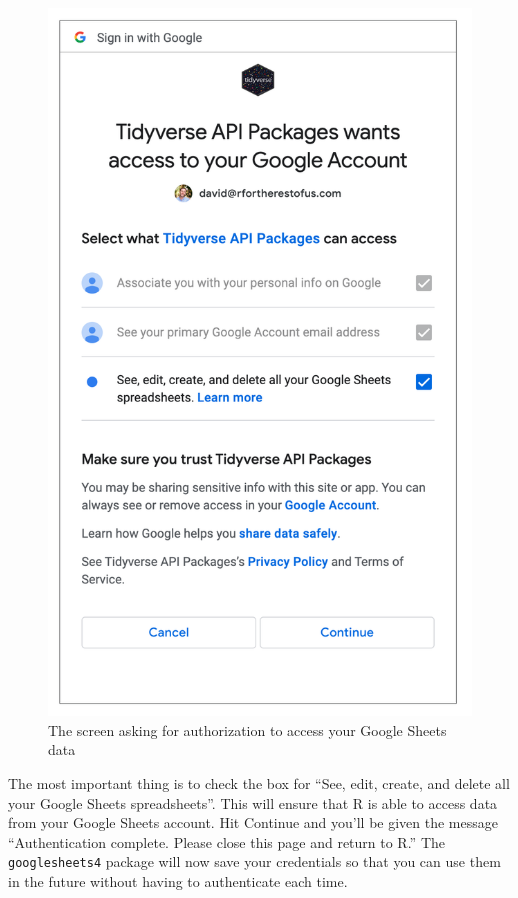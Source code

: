 \documentclass[
]{book}
\begin{document}
\begin{figure}
\includegraphics[width=1\linewidth]{assets/tidyverse-access-r} \caption{The screen asking for authorization to access your Google Sheets data}\label{fig:tidyverse-access-r}
\end{figure}

The most important thing is to check the box for ``See, edit, create, and delete all your Google Sheets spreadsheets''. This will ensure that R is able to access data from your Google Sheets account. Hit Continue and you'll be given the message ``Authentication complete. Please close this page and return to R.'' The \texttt{googlesheets4} package will now save your credentials so that you can use them in the future without having to authenticate each time.
\end{document}
